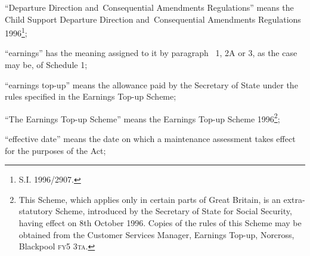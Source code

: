 \documentclass[12pt,a4paper]{article}
\begin{document}
\begin{enumerate}

\begin{sloppypar}
“Departure Direction and~Consequential Amendments Regulations” means the Child Support Departure Direction and~Consequential Amendments Regulations 1996\footnote{\frenchspacing S.I. 1996/2907.};
\end{sloppypar}



“earnings” has the meaning assigned to it by paragraph~
1, 2A or 3,  %
as the case may be, of Schedule 1;

“earnings top-up” means the allowance paid by the Secretary of State under the rules specified in the Earnings Top-up Scheme;

“The Earnings Top-up Scheme” means the Earnings Top-up Scheme 1996\footnote{\frenchspacing This Scheme, which applies only in certain parts of Great Britain, is an extra-statutory Scheme, introduced by the Secretary of State for Social Security, having effect on 8th October 1996. Copies of the rules of this Scheme may be obtained from the Customer Services Manager, Earnings Top-up, Norcross, Blackpool \textsc{fy5 3ta}.};

“effective date” means the date on which a maintenance assessment takes effect for the purposes of the Act;


\end{enumerate}
\end{document}

